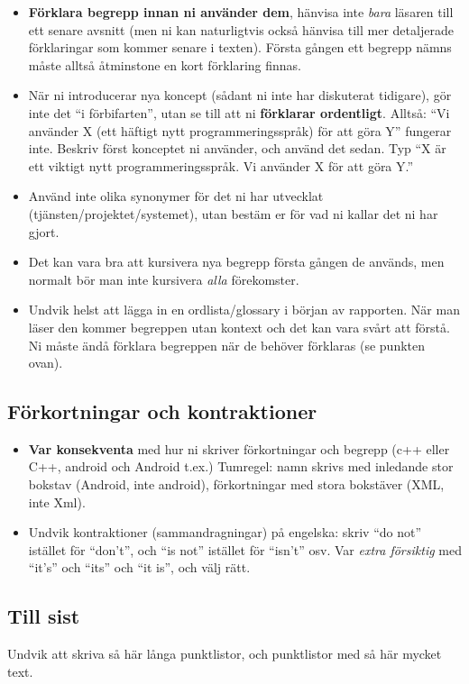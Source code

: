 \begin{itemize}
\label{app:definiera-innan-anv}
\item    \textbf{Förklara begrepp innan ni använder dem}, hänvisa inte \emph{bara} läsaren till ett senare avsnitt (men ni kan naturligtvis också hänvisa till mer detaljerade förklaringar som kommer senare i texten).  Första gången ett begrepp nämns måste alltså åt\-min\-sto\-ne en kort förklaring finnas.

\item    När ni introducerar nya koncept (sådant ni inte har diskuterat tidigare), gör inte det ``i förbifarten'', utan se till att ni \textbf{förklarar ordentligt}.  Alltså: ``Vi använder X (ett häftigt nytt programmeringsspråk) för att göra Y'' fungerar inte.  Beskriv först konceptet ni använder, och använd det sedan.  Typ ``X är ett viktigt nytt programmeringsspråk.  Vi använder X för att göra Y.''

\item    Använd inte olika synonymer för det ni har utvecklat (tjänsten/projektet/systemet), utan bestäm er för vad ni kallar det ni har gjort.

\item    Det kan vara bra att kursivera nya begrepp första gången de används, men normalt bör man inte kursivera \emph{alla} förekomster.

\item Undvik helst att lägga in en ordlista/glossary i början av rapporten. När man läser den kommer begreppen utan kontext och det kan vara svårt att förstå. Ni måste ändå förklara begreppen när de behöver förklaras (se punkten ovan).
\end{itemize}

\subsection*{Förkortningar och kontraktioner}
\begin{itemize}
\item    \textbf{Var konsekventa} med hur ni skriver förkortningar och begrepp (c++ eller C++, android och Android t.ex.)
Tumregel: namn skrivs med inledande stor bokstav (Android, inte android), förkortningar med stora bokstäver (XML, inte Xml).

\item Undvik kontraktioner (sammandragningar) på engelska: skriv ``do not'' istället för ``don't'', och ``is not'' istället för ``isn't'' osv. Var \emph{extra försiktig} med ``it's'' och ``its'' och ``it is'', och välj rätt.
\end{itemize}

\subsection*{Till sist}
Undvik att skriva så här långa punktlistor, och punktlistor med så här mycket text.



